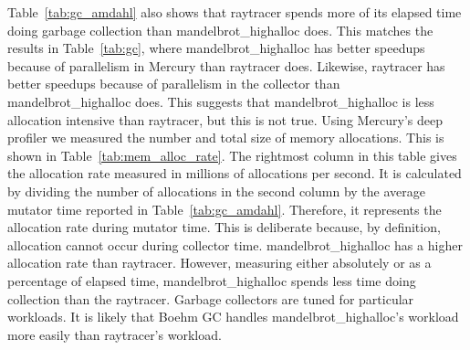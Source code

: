 Table~\ref{tab:gc_amdahl} also shows that raytracer spends more of its
elapsed time doing garbage collection than mandelbrot\_highalloc does.
This matches the results in Table~\ref{tab:gc},
where mandelbrot\_highalloc has better speedups because of parallelism in
Mercury than raytracer does.
Likewise,
raytracer has better speedups because of parallelism in the collector
than mandelbrot\_highalloc does.
This suggests that mandelbrot\_highalloc is less allocation intensive than
raytracer,
but this is not true.
Using Mercury's deep profiler we measured the number and total size of memory
allocations.
This is shown in Table~\ref{tab:mem_alloc_rate}.
The rightmost column in this table gives the allocation rate
measured in millions of allocations per second.
It is calculated by dividing the number of allocations in the second column
by the average mutator time reported in Table~\ref{tab:gc_amdahl}.
Therefore, it represents the allocation rate during mutator time.
This is deliberate because,
by definition,
allocation cannot occur during collector time.
mandelbrot\_highalloc has a higher allocation rate than raytracer.
However,
measuring either absolutely or as a percentage of elapsed time,
mandelbrot\_highalloc spends less time doing collection than the raytracer.
Garbage collectors are tuned for particular workloads.
It is likely that Boehm GC handles mandelbrot\_highalloc's workload more
easily than raytracer's workload.


